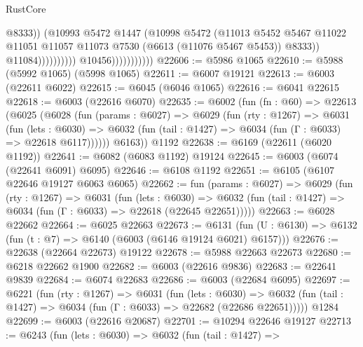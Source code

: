 \begin{lexlean}{RustCore}
\begin{coremodule}
                                                @8333))
                                            (@10993
                                              @5472
                                              @1447
                                              (@10998
                                                @5472
                                                (@11013
                                                  @5452
                                                  @5467
                                                  @11022
                                                  @11051
                                                  @11057
                                                  @11073
                                                  @7530
                                                  (@6613 (@11076 @5467 @5453))
                                                  @8333))
                                              @11084))))))))))
                          @10456)))))))))))
@22606 := @5986 @1065
@22610 := @5988 (@5992 @1065) (@5998 @1065)
@22611 := @6007 @19121
@22613 := @6003 (@22611 @6022)
@22615 := @6045 (@6046 @1065)
@22616 := @6041 @22615
@22618 := @6003 (@22616 @6070)
@22635 := @6002
    (fun (fn : @60) =>
    @22613
      (@6025
        (@6028
          (fun (params : @6027) =>
          @6029
            (fun (rty : @1267) =>
            @6031
              (fun (lets : @6030) =>
              @6032 (fun (tail : @1427) => @6034 (fun (Γ : @6033) => @22618 @6117))))))
        @6163))
    @1192
@22638 := @6169 (@22611 (@6020 @1192))
@22641 := @6082 (@6083 @1192) @19124
@22645 := @6003 (@6074 (@22641 @6091) @6095)
@22646 := @6108 @1192
@22651 := @6105 (@6107 @22646 @19127 @6063 @6065)
@22662 := fun (params : @6027) =>
  @6029
    (fun (rty : @1267) =>
    @6031
      (fun (lets : @6030) =>
      @6032 (fun (tail : @1427) => @6034 (fun (Γ : @6033) => @22618 (@22645 @22651)))))
@22663 := @6028 @22662
@22664 := @6025 @22663
@22673 := @6131
    (fun (U : @6130) => @6132 (fun (t : @7) => @6140 (@6003 (@6146 @19124 @6021) @6157)))
@22676 := @22638 (@22664 @22673) @19122
@22678 := @5988 @22663 @22673
@22680 := @6218 @22662 @1900
@22682 := @6003 (@22616 @9836)
@22683 := @22641 @9839
@22684 := @6074 @22683
@22686 := @6003 (@22684 @6095)
@22697 := @6221
    (fun (rty : @1267) =>
    @6031
      (fun (lets : @6030) =>
      @6032 (fun (tail : @1427) => @6034 (fun (Γ : @6033) => @22682 (@22686 @22651)))))
    @1284
@22699 := @6003 (@22616 @20687)
@22701 := @10294 @22646 @19127
@22713 := @6243
    (fun (lets : @6030) =>
    @6032
      (fun (tail : @1427) =>

\end{coremodule}
\end{lexlean}
